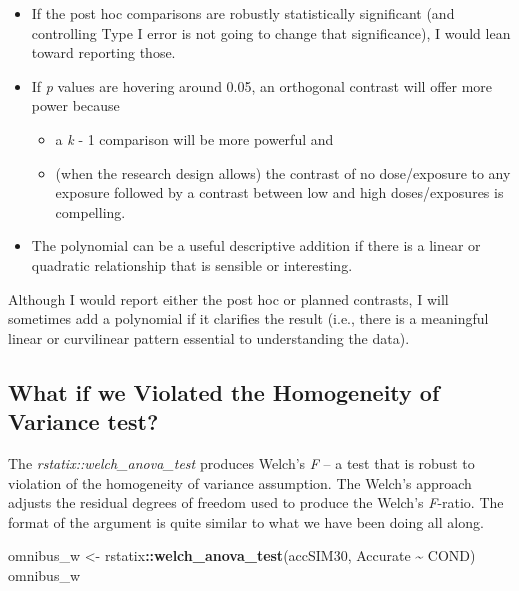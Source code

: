 \documentclass[
  11pt,
]{book}
\newenvironment{Shaded}{\begin{snugshade}}{\end{snugshade}}
\newcommand{\FunctionTok}[1]{\textcolor[rgb]{0.27,0.27,0.27}{\textbf{#1}}}
\newcommand{\NormalTok}[1]{#1}
\newcommand{\OtherTok}[1]{\textcolor[rgb]{0.37,0.37,0.37}{#1}}
\newcommand{\SpecialCharTok}[1]{\textcolor[rgb]{0.43,0.43,0.43}{\textbf{#1}}}
\providecommand{\tightlist}{%
  \setlength{\itemsep}{0pt}\setlength{\parskip}{0pt}}
\begin{document}
\begin{itemize}
\tightlist
\item
  If the post hoc comparisons are robustly statistically significant (and controlling Type I error is not going to change that significance), I would lean toward reporting those.
\item
  If \emph{p} values are hovering around 0.05, an orthogonal contrast will offer more power because

  \begin{itemize}
  \tightlist
  \item
    a \emph{k} - 1 comparison will be more powerful and
  \item
    (when the research design allows) the contrast of no dose/exposure to any exposure followed by a contrast between low and high doses/exposures is compelling.
  \end{itemize}
\item
  The polynomial can be a useful descriptive addition if there is a linear or quadratic relationship that is sensible or interesting.
\end{itemize}

Although I would report either the post hoc or planned contrasts, I will sometimes add a polynomial if it clarifies the result (i.e., there is a meaningful linear or curvilinear pattern essential to understanding the data).

\hypertarget{what-if-we-violated-the-homogeneity-of-variance-test}{%
\subsection{What if we Violated the Homogeneity of Variance test?}\label{what-if-we-violated-the-homogeneity-of-variance-test}}

The \emph{rstatix::welch\_anova\_test} produces Welch's \emph{F} -- a test that is robust to violation of the homogeneity of variance assumption. The Welch's approach adjusts the residual degrees of freedom used to produce the Welch's \emph{F}-ratio. The format of the argument is quite similar to what we have been doing all along.

\begin{Shaded}
\begin{Highlighting}[]
\NormalTok{omnibus\_w }\OtherTok{\textless{}{-}}\NormalTok{ rstatix}\SpecialCharTok{::}\FunctionTok{welch\_anova\_test}\NormalTok{(accSIM30, Accurate }\SpecialCharTok{\textasciitilde{}}\NormalTok{ COND)}
\NormalTok{omnibus\_w}
\end{Highlighting}
\end{Shaded}
\end{document}
